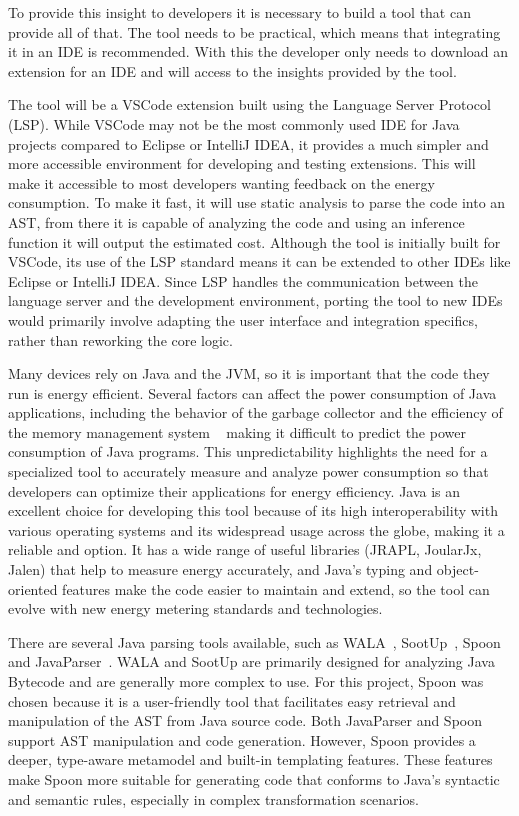 To provide this insight to developers it is necessary to build a tool that can provide all of that. The tool needs to be practical, which means that integrating it in an IDE is recommended. With this the developer only needs to download an extension for an IDE and will access to the insights provided by the tool.


The tool will be a VSCode extension built using the Language Server Protocol (LSP). While VSCode may not be the most commonly used IDE for Java projects compared to Eclipse or IntelliJ IDEA, it provides a much simpler and more accessible environment for developing and testing extensions. This will make it accessible to most developers wanting feedback on the energy consumption. To make it fast, it will use static analysis to parse the code into an AST, from there it is capable of analyzing the code and using an inference function it will output the estimated cost.
Although the tool is initially built for VSCode, its use of the LSP standard means it can be extended to other IDEs like Eclipse or IntelliJ IDEA. Since LSP handles the communication between the language server and the development environment, porting the tool to new IDEs would primarily involve adapting the user interface and integration specifics, rather than reworking the core logic.


Many devices rely on Java and the JVM, so it is important that the code they run is energy efficient. Several factors can affect the power consumption of Java applications, including the behavior of the garbage collector and the efficiency of the memory management system ~\cite{10.5555/1267847.1267870} making it difficult to predict the power consumption of Java programs. This unpredictability highlights the need for a specialized tool to accurately measure and analyze power consumption so that developers can optimize their applications for energy efficiency.
Java is an excellent choice for developing this tool because of its high interoperability with various operating systems and its widespread usage across the globe, making it a reliable and option. It has a wide range of useful libraries (JRAPL, JoularJx, Jalen) that help to measure energy accurately, and Java's typing and object-oriented features make the code easier to maintain and extend, so the tool can evolve with new energy metering standards and technologies. 

There are several Java parsing tools available, such as WALA~\cite{wala_main}, SootUp~\cite{sootup_main}, Spoon~\cite{spoon_main} and JavaParser~\cite{javaParser}. WALA and SootUp are primarily designed for analyzing Java Bytecode and are generally more complex to use. For this project, Spoon was chosen because it is a user-friendly tool that facilitates easy retrieval and manipulation of the AST from Java source code. Both JavaParser and Spoon support AST manipulation and code generation. However, Spoon provides a deeper, type-aware metamodel and built-in templating features. These features make Spoon more suitable for generating code that conforms to Java’s syntactic and semantic rules, especially in complex transformation scenarios.

